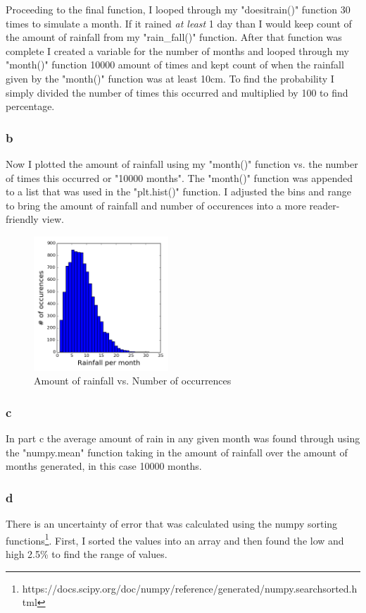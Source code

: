\documentclass[twocolumn]{revtex4}
\begin{document}
Proceeding to the final function, I looped through my "doesitrain()" function 30 times to simulate a month. If it rained \textit{at least} 1 day than I would keep count of the amount of rainfall from my "rain\_fall()" function. After that function was complete I created a variable for the number of months and looped through my "month()" function 10000 amount of times and kept count of when the rainfall given by the "month()" function was at least 10cm. To find the probability I simply divided the number of times this occurred and multiplied by 100 to find percentage.
\subsubsection{b}
Now I plotted the amount of rainfall using my "month()" function vs. the number of times this occurred or "10000 months". The "month()" function was appended to a list that was used in the "plt.hist()" function. I adjusted the bins and range to bring the amount of rainfall and number of occurences into a more reader-friendly view.

\begin{figure}[H]
    \includegraphics[width=0.45\textwidth]{hist_plot.png}
    \caption{Amount of rainfall vs. Number of occurrences}
\end{figure}
\subsubsection{c}
In part c the average amount of rain in any given month was found through using the "numpy.mean" function taking in the amount of rainfall over the amount of months generated, in this case 10000 months.

\subsubsection{d}
There is an uncertainty of error that was calculated using the numpy sorting functions\footnote{https://docs.scipy.org/doc/numpy/reference/generated/numpy.searchsorted.html}. First, I sorted the values into an array and then found the low and high 2.5\% to find the range of values.
\end{document}
